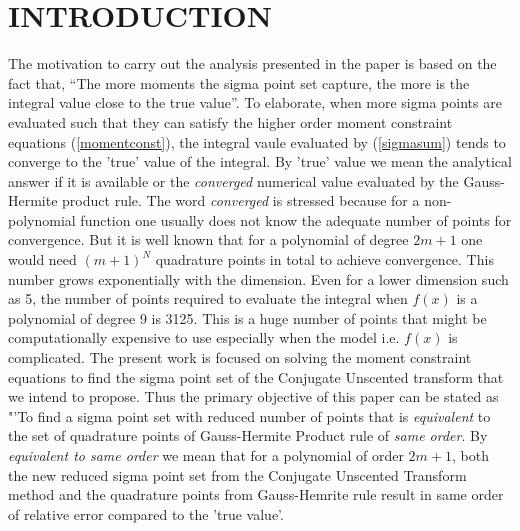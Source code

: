 \documentclass[letterpaper, 10 pt, conference]{ieeeconf}  %
\begin{document}
\section{INTRODUCTION}
The motivation to carry out the analysis presented in the paper is based on the fact that, "`The more moments the sigma point set capture, the more is the integral value close to the true value"'. To elaborate, when more sigma points are evaluated such that they can satisfy the higher order moment constraint equations (\ref{momentconst}), the integral vaule evaluated by (\ref{sigmasum}) tends to converge to the 'true' value of the integral. By 'true' value we mean the analytical answer if it is available or the \emph{converged} numerical value evaluated by the Gauss-Hermite product rule. The word \emph{converged} is stressed because for a non-polynomial function one usually does not know the adequate number of points for convergence. But it is well known that for a polynomial of degree $2m+1$ one would need $(m+1)^N$ quadrature points in total to achieve convergence. This number grows exponentially with the dimension. Even for a lower dimension such as 5, the number of points required to evaluate the integral when $f(x)$ is a polynomial of degree 9 is 3125. This is a huge number of points that might be computationally expensive to use especially when the model i.e. $f(x)$ is complicated.\newline
The present work is focused on solving the moment constraint equations to find the sigma point set of the Conjugate Unscented transform that we intend to propose. Thus the primary objective of this paper can be stated as "'To find a sigma point set with reduced number of points that is \emph{equivalent} to the set of quadrature points of Gauss-Hermite Product rule of \emph{same order}. By \emph{equivalent to same order} we mean that for a polynomial of order $2m+1$, both the new reduced sigma point set from the Conjugate Unscented Transform method and the quadrature points from Gauss-Hemrite rule result in same order of relative error compared to the 'true value'.  
\end{document}
